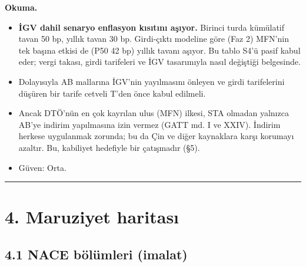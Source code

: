 \endgroup

\textbf{Okuma.}

\begin{itemize}
\tightlist
\item
  \textbf{İGV dahil senaryo enflasyon kısıtını aşıyor.} Birinci turda kümülatif tavan 50 bp, yıllık tavan 30 bp. Girdi-çıktı modeline göre (Faz 2) MFN'nin tek başına etkisi de (P50 42 bp) yıllık tavanı aşıyor. Bu tablo S4'ü pasif kabul eder; vergi takası, girdi tarifeleri ve İGV tasarımıyla nasıl değiştiği  belgesinde.
\item
  Dolayısıyla AB mallarına İGV'nin yayılmasını önleyen ve girdi tarifelerini düşüren bir tarife cetveli T'den önce kabul edilmeli.
\item
  Ancak DTÖ'nün en çok kayrılan ulus (MFN) ilkesi, STA olmadan yalnızca AB'ye indirim yapılmasına izin vermez (GATT md. I ve XXIV). İndirim herkese uygulanmak zorunda; bu da Çin ve diğer kaynaklara karşı korumayı azaltır. Bu, kabiliyet hedefiyle bir çatışmadır (§5).
\item
  Güven: Orta.
\end{itemize}

\begin{center}\rule{0.5\linewidth}{0.5pt}\end{center}

\hypertarget{01_teshis-4-maruziyet-haritasux131}{%
\section{4. Maruziyet haritası}\label{01_teshis-4-maruziyet-haritasux131}}

\hypertarget{01_teshis-41-nace-buxf6luxfcmleri-imalat}{%
\subsection{4.1 NACE bölümleri (imalat)}\label{01_teshis-41-nace-buxf6luxfcmleri-imalat}}

